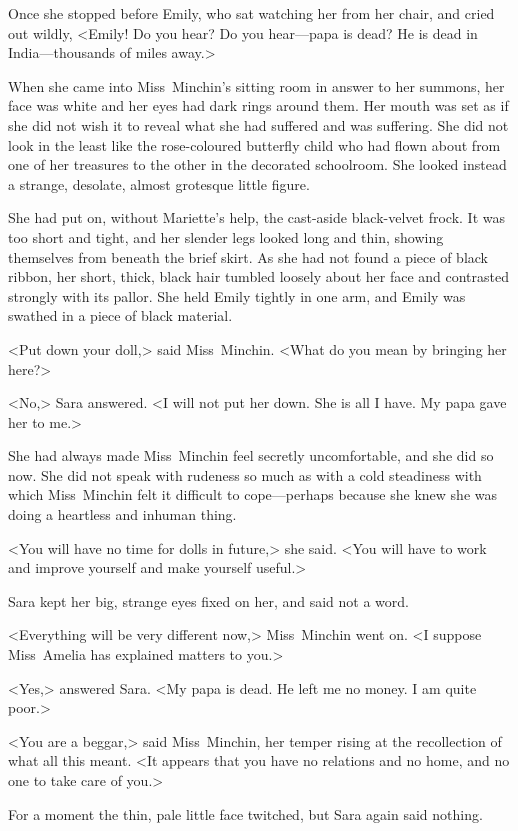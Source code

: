 Once she stopped before Emily, who sat watching her from her chair, and cried out wildly, <Emily! Do you hear? Do you hear—papa is dead? He is dead in India—thousands of miles away.>

When she came into Miss~Minchin's sitting room in answer to her summons, her face was white and her eyes had dark rings around them. Her mouth was set as if she did not wish it to reveal what she had suffered and was suffering. She did not look in the least like the rose-coloured butterfly child who had flown about from one of her treasures to the other in the decorated schoolroom. She looked instead a strange, desolate, almost grotesque little figure.

She had put on, without Mariette's help, the cast-aside black-velvet frock. It was too short and tight, and her slender legs looked long and thin, showing themselves from beneath the brief skirt. As she had not found a piece of black ribbon, her short, thick, black hair tumbled loosely about her face and contrasted strongly with its pallor. She held Emily tightly in one arm, and Emily was swathed in a piece of black material.

<Put down your doll,> said Miss~Minchin. <What do you mean by bringing her here?>

<No,> Sara answered. <I will not put her down. She is all I have. My papa gave her to me.>

She had always made Miss~Minchin feel secretly uncomfortable, and she did so now. She did not speak with rudeness so much as with a cold steadiness with which Miss~Minchin felt it difficult to cope—perhaps because she knew she was doing a heartless and inhuman thing.

<You will have no time for dolls in future,> she said. <You will have to work and improve yourself and make yourself useful.>

Sara kept her big, strange eyes fixed on her, and said not a word.

<Everything will be very different now,> Miss~Minchin went on. <I suppose Miss~Amelia has explained matters to you.>

<Yes,> answered Sara. <My papa is dead. He left me no money. I am quite poor.>

<You are a beggar,> said Miss~Minchin, her temper rising at the recollection of what all this meant. <It appears that you have no relations and no home, and no one to take care of you.>

For a moment the thin, pale little face twitched, but Sara again said nothing.

